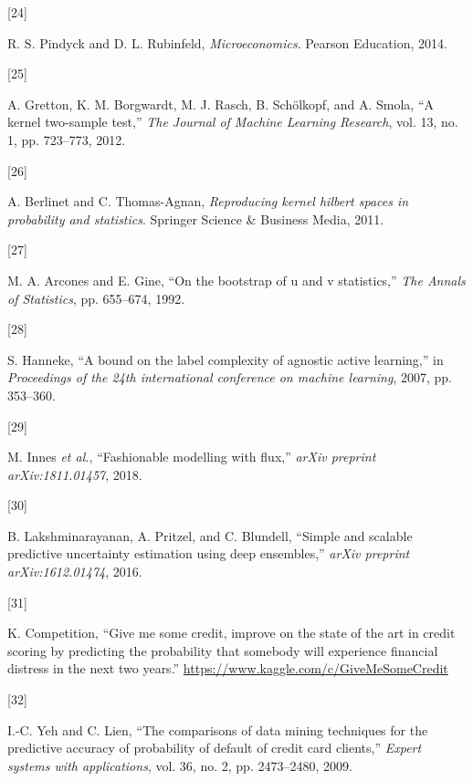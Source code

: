 \documentclass[conference,final,]{IEEEtran}
\newlength{\cslhangindent}
\newlength{\csllabelwidth}
\newlength{\cslentryspacingunit} %
\newenvironment{CSLReferences}[2] %
 {%
  \setlength{\parindent}{0pt}
  \ifodd #1
  \let\oldpar\par
  \def\par{\hangindent=\cslhangindent\oldpar}
  \fi
  \setlength{\parskip}{#2\cslentryspacingunit}
 }%
 {}
\newcommand{\CSLLeftMargin}[1]{\parbox[t]{\csllabelwidth}{#1}}
\newcommand{\CSLRightInline}[1]{\parbox[t]{\linewidth - \csllabelwidth}{#1}\break}
\theoremstyle{definition}
\theoremstyle{definition}
\theoremstyle{definition}
\theoremstyle{definition}
\theoremstyle{remark}
\begin{document}
\begin{CSLReferences}{0}{0}
\leavevmode{}%
\CSLLeftMargin{{[}24{]} }%
\CSLRightInline{R. S. Pindyck and D. L. Rubinfeld, \emph{Microeconomics}. Pearson Education, 2014.}

\leavevmode{}%
\CSLLeftMargin{{[}25{]} }%
\CSLRightInline{A. Gretton, K. M. Borgwardt, M. J. Rasch, B. Schölkopf, and A. Smola, {``A kernel two-sample test,''} \emph{The Journal of Machine Learning Research}, vol. 13, no. 1, pp. 723--773, 2012.}

\leavevmode{}%
\CSLLeftMargin{{[}26{]} }%
\CSLRightInline{A. Berlinet and C. Thomas-Agnan, \emph{Reproducing kernel hilbert spaces in probability and statistics}. Springer Science \& Business Media, 2011.}

\leavevmode{}%
\CSLLeftMargin{{[}27{]} }%
\CSLRightInline{M. A. Arcones and E. Gine, {``On the bootstrap of u and v statistics,''} \emph{The Annals of Statistics}, pp. 655--674, 1992.}

\leavevmode{}%
\CSLLeftMargin{{[}28{]} }%
\CSLRightInline{S. Hanneke, {``A bound on the label complexity of agnostic active learning,''} in \emph{Proceedings of the 24th international conference on machine learning}, 2007, pp. 353--360.}

\leavevmode{}%
\CSLLeftMargin{{[}29{]} }%
\CSLRightInline{M. Innes \emph{et al.}, {``Fashionable modelling with flux,''} \emph{arXiv preprint arXiv:1811.01457}, 2018.}

\leavevmode{}%
\CSLLeftMargin{{[}30{]} }%
\CSLRightInline{B. Lakshminarayanan, A. Pritzel, and C. Blundell, {``Simple and scalable predictive uncertainty estimation using deep ensembles,''} \emph{arXiv preprint arXiv:1612.01474}, 2016.}

\leavevmode{}%
\CSLLeftMargin{{[}31{]} }%
\CSLRightInline{K. Competition, {``Give me some credit, improve on the state of the art in credit scoring by predicting the probability that somebody will experience financial distress in the next two years.''} \url{https://www.kaggle.com/c/GiveMeSomeCredit}}

\leavevmode{}%
\CSLLeftMargin{{[}32{]} }%
\CSLRightInline{I.-C. Yeh and C. Lien, {``The comparisons of data mining techniques for the predictive accuracy of probability of default of credit card clients,''} \emph{Expert systems with applications}, vol. 36, no. 2, pp. 2473--2480, 2009.}


\end{CSLReferences}
\end{document}
